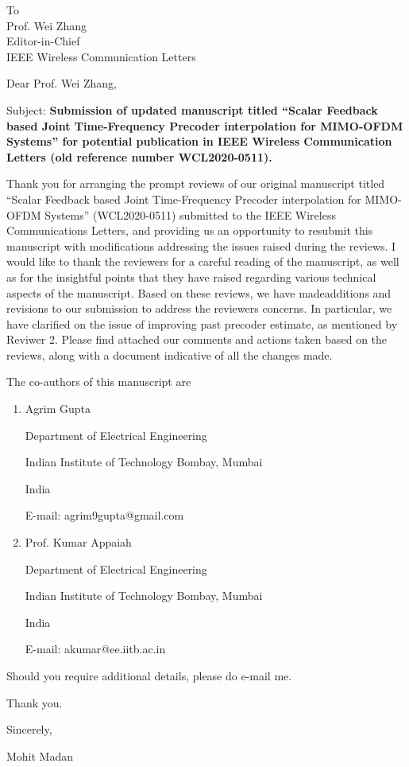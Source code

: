 \documentclass{letter}
\date{\today}
\begin{document}
\begin{letter}{To\\
Prof. Wei Zhang\\
Editor-in-Chief\\
IEEE Wireless Communication Letters}
\vspace{0.5in}


\opening{Dear Prof. Wei Zhang,}

Subject: \textbf{Submission of updated manuscript titled ``Scalar Feedback based Joint Time-Frequency Precoder
  interpolation for  MIMO-OFDM Systems'' for potential publication in
  IEEE Wireless Communication Letters (old reference number  WCL2020-0511).}

Thank you for arranging the prompt reviews of our original manuscript
titled ``Scalar Feedback based Joint Time-Frequency Precoder
interpolation for MIMO-OFDM Systems'' (WCL2020-0511) submitted to the
IEEE Wireless Communications Letters, and providing us an opportunity
to resubmit this manuscript with modifications addressing the issues
raised during the reviews. I would like to thank the reviewers for a
careful reading of the manuscript, as well as for the insightful
points that they have raised regarding various technical aspects of
the manuscript. Based on these reviews, we have madeadditions and
revisions to our submission to address the reviewers concerns. In
particular, we have clarified on the issue of improving past precoder
estimate, as mentioned by Reviwer 2. Please find attached our comments
and actions taken based on the reviews, along with a document
indicative of all the changes made.

The co-authors of this manuscript are
\begin{enumerate}
\item  Agrim Gupta

Department of Electrical  Engineering

Indian Institute of Technology Bombay, Mumbai

India

E-mail: agrim9gupta@gmail.com


\item Prof. Kumar Appaiah

Department of Electrical  Engineering

Indian Institute of Technology Bombay, Mumbai

India

E-mail: akumar@ee.iitb.ac.in

\end{enumerate}

Should you require additional details, please do e-mail me.

Thank you.
\vspace{0.3in}

Sincerely,

Mohit Madan

\end{letter}
\end{document}
